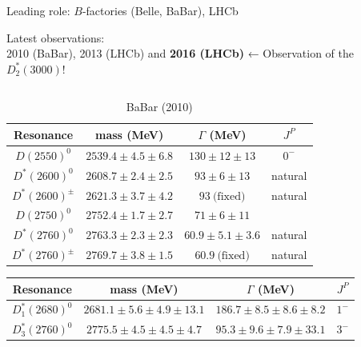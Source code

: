 \documentclass[professionalfonts,aspectratio=169]{beamer}
\begin{document}
\begin{frame}
  Leading role: $B$-factories (Belle, BaBar), LHCb
  
  Latest observations: \\ 2010 (BaBar), 2013 (LHCb) 
  and \textbf{2016 (LHCb)} ← \alert{Observation of the $D^*_2(3000)$!}

  \begin{columns}
    \captionsetup{skip=1pt}
    \begin{column}{0.5\textwidth}
      \begin{table}
        \fontsize{4.5pt}{6pt}\selectfont
        \centering
        \begin{tabular}{*{4}{@{\hskip 2pt}c@{\hskip 2pt}}}
          \toprule
          Resonance & mass (MeV) & $\Gamma$ (MeV) & $J^P$ \\ 
          \midrule
          $D(2550)^0 $ & $2539.4 \pm 4.5 \pm 6.8$ & $130 \pm 12 \pm 13$ & $0^-$ \\
          \addlinespace[2pt]
          $D^*(2600)^0$ & $2608.7 \pm 2.4 \pm 2.5$ & $93 \pm 6 \pm 13$ & natural \\
          $D^*(2600)^\pm$ & $2621.3 \pm 3.7 \pm 4.2$ & $93 \ \text{(fixed)}$ & natural \\
          \addlinespace[2pt]
          $D(2750)^0$ & $2752.4 \pm 1.7 \pm 2.7$ & $71 \pm 6 \pm 11$ & \\
          \addlinespace[2pt]
          $D^*(2760)^0$ & $2763.3 \pm 2.3 \pm 2.3$ & $60.9  \pm 5.1 \pm 3.6$ & natural \\
          $D^*(2760)^\pm$ & $2769.7 \pm 3.8 \pm 1.5$ & $60.9 \ \text{(fixed)}$ & natural \\
          \bottomrule
        \end{tabular}
        \caption*{\tiny BaBar (2010)}
      \end{table}
      \vspace*{-\baselineskip}
      \begin{table}
        \fontsize{4.5pt}{6pt}\selectfont
        \centering
        \begin{tabular}{*{4}{@{\hskip 2pt}c@{\hskip 2pt}}}
          \toprule
          Resonance & mass (MeV) & $\Gamma$ (MeV) & $J^P$ \\ 
          \midrule
          $D^*_1(2680)^0$   & $2681.1 \pm 5.6 \pm 4.9 \pm 13.1$ & $186.7 \pm 8.5 \pm 8.6 \pm 8.2$  & $1^-$ \\
          $D^*_3(2760)^0$   & $2775.5 \pm 4.5 \pm 4.5 \pm 4.7$  & $95.3  \pm 9.6 \pm 7.9 \pm 33.1$ & $3^-$ \\

\end{tabular}
\end{table}
\end{column}
\end{columns}
\end{frame}
\end{document}
